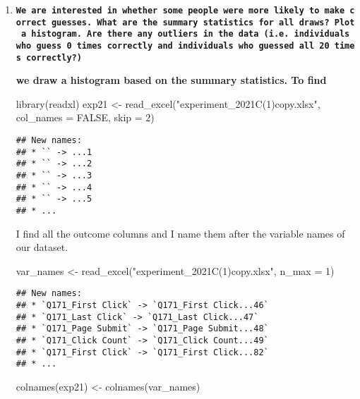 \documentclass[
]{article}
\newenvironment{Shaded}{\begin{snugshade}}{\end{snugshade}}
\newcommand{\AttributeTok}[1]{\textcolor[rgb]{0.77,0.63,0.00}{#1}}
\newcommand{\ConstantTok}[1]{\textcolor[rgb]{0.00,0.00,0.00}{#1}}
\newcommand{\DecValTok}[1]{\textcolor[rgb]{0.00,0.00,0.81}{#1}}
\newcommand{\FunctionTok}[1]{\textcolor[rgb]{0.00,0.00,0.00}{#1}}
\newcommand{\NormalTok}[1]{#1}
\newcommand{\OtherTok}[1]{\textcolor[rgb]{0.56,0.35,0.01}{#1}}
\newcommand{\StringTok}[1]{\textcolor[rgb]{0.31,0.60,0.02}{#1}}
\begin{document}
\begin{enumerate}
\def\labelenumi{\arabic{enumi}.}
\item
  \textbf{\texttt{We\ are\ interested\ in\ whether\ some\ people\ were\ more\ likely\ to\ make\ correct\ guesses.\ What\ are\ the\ summary\ statistics\ for\ all\ draws?\ Plot\ a\ histogram.\ Are\ there\ any\ outliers\ in\ the\ data\ (i.e.\ individuals\ who\ guess\ 0\ times\ correctly\ and\ individuals\ who\ guessed\ all\ 20\ times\ correctly?)}}

  \textbf{we draw a histogram based on the summary statistics. To find}

\begin{Shaded}
\begin{Highlighting}[]
\FunctionTok{library}\NormalTok{(readxl)}
\NormalTok{exp21 }\OtherTok{\textless{}{-}} \FunctionTok{read\_excel}\NormalTok{(}\StringTok{"experiment\_2021C(1)copy.xlsx"}\NormalTok{, }\AttributeTok{col\_names =} \ConstantTok{FALSE}\NormalTok{,}
    \AttributeTok{skip =} \DecValTok{2}\NormalTok{)}
\end{Highlighting}
\end{Shaded}

\begin{verbatim}
## New names:
## * `` -> ...1
## * `` -> ...2
## * `` -> ...3
## * `` -> ...4
## * `` -> ...5
## * ...
\end{verbatim}

  I find all the outcome columns and I name them after the variable
  names of our dataset.

\begin{Shaded}
\begin{Highlighting}[]
\NormalTok{var\_names }\OtherTok{\textless{}{-}} \FunctionTok{read\_excel}\NormalTok{(}\StringTok{"experiment\_2021C(1)copy.xlsx"}\NormalTok{, }\AttributeTok{n\_max =} \DecValTok{1}\NormalTok{) }
\end{Highlighting}
\end{Shaded}

\begin{verbatim}
## New names:
## * `Q171_First Click` -> `Q171_First Click...46`
## * `Q171_Last Click` -> `Q171_Last Click...47`
## * `Q171_Page Submit` -> `Q171_Page Submit...48`
## * `Q171_Click Count` -> `Q171_Click Count...49`
## * `Q171_First Click` -> `Q171_First Click...82`
## * ...
\end{verbatim}

\begin{Shaded}
\begin{Highlighting}[]
\FunctionTok{colnames}\NormalTok{(exp21) }\OtherTok{\textless{}{-}} \FunctionTok{colnames}\NormalTok{(var\_names)}


\end{Highlighting}
\end{Shaded}
\end{enumerate}
\end{document}
